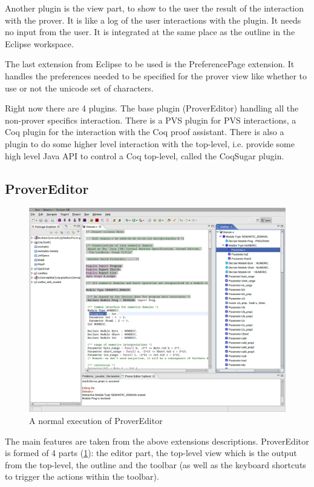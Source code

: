 \documentclass{entcs}
\begin{document}
Another plugin is the view part, to show to the user the result of the
interaction with the prover. It is like a log of the user interactions
with the plugin. It needs no input from the user. It is integrated
at the same place as the outline in the Eclipse workspace.

The last extension from Eclipse to be used is the PreferencePage extension.
It handles the preferences needed to be specified for the prover view
like whether to use or not the unicode set of characters.


Right now there are 4 plugins. The base plugin (ProverEditor)
handling all the non-prover specifics interaction. There is a PVS plugin for
PVS interactions, a Coq plugin for the interaction with the Coq proof 
assistant. There is also a plugin to do some higher level interaction 
with the top-level, i.e. provide some high level Java API to control 
a Coq top-level, called the CoqSugar plugin. 
\subsection{ProverEditor}
\begin{figure}
\begin{center}
\includegraphics[width=\linewidth]{screenshot1}
\end{center}
  \caption{A normal execution of ProverEditor}
  \label{scrs1}
\end{figure}
The main features are taken from the above extensions descriptions.
ProverEditor is formed of 4 parts (\ref{scrs1}): the editor part, the top-level view
which is the output from the top-level, the outline and the toolbar (as well as the keyboard 
shortcuts to trigger the actions within the toolbar).
\end{document}
